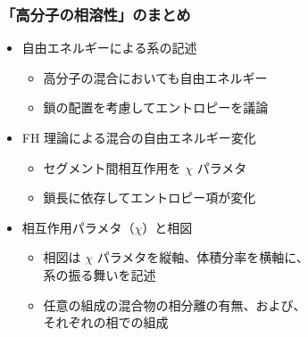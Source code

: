\documentclass[unicode,12pt]{beamer}%
\begin{document}
\begin{frame}
	\frametitle{「高分子の相溶性」のまとめ}
        \begin{boxnote}
            \vspace{-3mm}
            \begin{itemize}
                \item 自由エネルギーによる系の記述
                    \begin{itemize}
                        \item 高分子の混合においても自由エネルギー
                        \item 鎖の配置を考慮してエントロピーを議論
                    \end{itemize} 
                \item FH 理論による混合の自由エネルギー変化
                    \begin{itemize}
                        \item セグメント間相互作用を $\chi$ パラメタ
                        \item 鎖長に依存してエントロピー項が変化
                    \end{itemize} 
                \item 相互作用パラメタ（$\chi$）と相図
                    \begin{itemize}
                        \item 相図は $\chi$ パラメタを縦軸、体積分率を横軸に、\\系の振る舞いを記述
                        \item 任意の組成の混合物の相分離の有無、および、\\それぞれの相での組成
                    \end{itemize}
            \end{itemize}
        \end{boxnote}
\end{frame}
\end{document}
